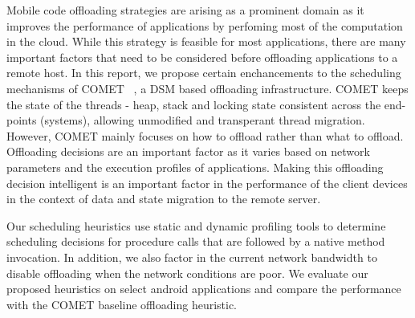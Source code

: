 \vspace{2mm}
Mobile code offloading strategies are arising as a prominent domain as it improves the performance of
applications by perfoming most of the computation in the cloud. While this strategy is feasible for most
applications, there are many important factors that need to be considered before offloading applications
to a remote host. In this report, we propose certain enchancements to the scheduling mechanisms of COMET
~\cite{comet},
a DSM based offloading infrastructure. COMET keeps the state of the threads - heap, stack and locking state
consistent across the end-points (systems), allowing unmodified and transperant thread migration. However,
COMET mainly focuses on how to offload rather than what to offload.
Offloading decisions are an important factor as it varies based on network parameters and the execution
profiles of applications. Making this offloading decision intelligent is an important factor in the
performance of the client devices in the context of data and state migration to the remote server.

Our scheduling heuristics use static and dynamic profiling tools to determine scheduling decisions for
procedure calls that are followed by a native
method invocation. In addition, we also factor in the current network bandwidth to disable offloading when the network
conditions are poor. We evaluate our proposed heuristics on select android applications and compare the
performance with the COMET baseline offloading heuristic.
